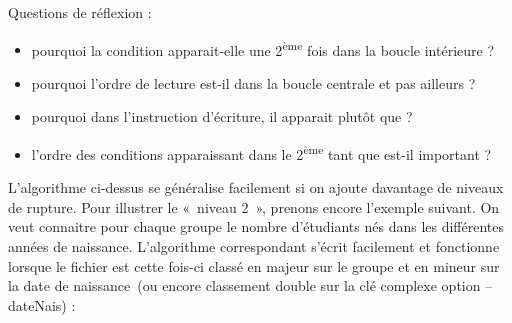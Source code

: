 
Questions de réflexion :

\begin{itemize}
	\item 
		pourquoi la condition 
		apparait-elle une 2\textsuperscript{ème} fois dans la boucle 
		intérieure ?
	\item 
		pourquoi l’ordre de lecture est-il dans la boucle centrale et pas
		ailleurs ?
	\item 
		pourquoi dans l’instruction d’écriture, il apparait
		 plutôt que
		 ?
	\item 
		l’ordre des conditions apparaissant dans le 2\textsuperscript{ème} tant
		que est-il important ?
\end{itemize}

L’algorithme ci-dessus se généralise facilement si on ajoute davantage
de niveaux de rupture. Pour illustrer le «~niveau 2~», prenons encore
l’exemple suivant. On veut connaitre pour chaque groupe le nombre
d’étudiants nés dans les différentes années de naissance. L’algorithme
correspondant s’écrit facilement et fonctionne lorsque le fichier est
cette fois-ci classé en majeur sur le groupe et en mineur sur la date
de naissance~(ou encore classement double sur la clé complexe option –
dateNais) :

